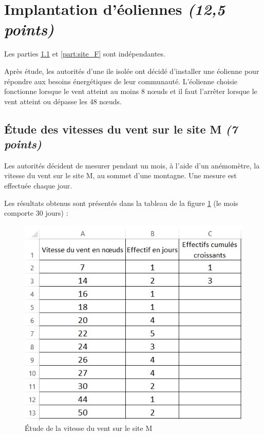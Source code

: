 \section{Implantation d'éoliennes \textit{(12,5 points)}}

Les parties \ref{part:site_M} et \ref{part:site_F} sont indépendantes.

Après étude, les autorités d'une ile isolée ont décidé d'installer une éolienne pour répondre aux besoins énergétiques de leur communauté. L'éolienne choisie fonctionne lorsque le vent atteint au moins 8 n\oe uds et il faut l'arrêter lorsque le vent atteint ou dépasse les 48 n\oe uds. 

\subsection{\'Etude des vitesses du vent sur le site M \textit{(7 points)}}\label{part:site_M}

Les autorités décident de mesurer pendant un mois, à l'aide d'un anémomètre, la vitesse du vent sur le site M, au sommet d'une montagne. Une mesure est effectuée chaque jour.

Les résultats obtenus sont présentés dans la tableau de la figure \ref{tab:site_M} (le mois comporte 30 jours) :

\begin{figure}[h]
	\begin{center}
		\includegraphics[scale=0.8]{eoliennes2}
	\end{center}
\caption{\'Etude de la vitesse du vent sur le site M}
\label{tab:site_M}
\end{figure}

